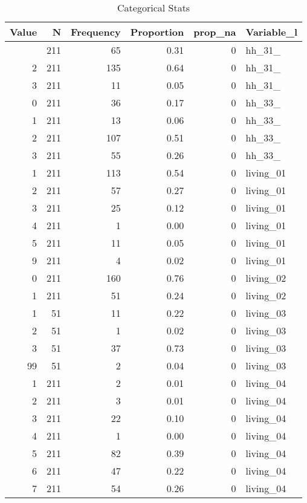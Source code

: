 \begin{table}[!t]
\caption*{
{\large Categorical Stats}
} 
\fontsize{12.0pt}{14.4pt}\selectfont
\begin{tabular*}{\linewidth}{@{\extracolsep{\fill}}rrrrrl}
\toprule
Value & N & Frequency & Proportion & prop\_na & Variable\_l \\ 
\midrule\addlinespace[2.5pt]
0 & 211 & 65 & 0.31 & 0 & hh\_31\_ \\ 
2 & 211 & 135 & 0.64 & 0 & hh\_31\_ \\ 
3 & 211 & 11 & 0.05 & 0 & hh\_31\_ \\ 
0 & 211 & 36 & 0.17 & 0 & hh\_33\_ \\ 
1 & 211 & 13 & 0.06 & 0 & hh\_33\_ \\ 
2 & 211 & 107 & 0.51 & 0 & hh\_33\_ \\ 
3 & 211 & 55 & 0.26 & 0 & hh\_33\_ \\ 
1 & 211 & 113 & 0.54 & 0 & living\_01 \\ 
2 & 211 & 57 & 0.27 & 0 & living\_01 \\ 
3 & 211 & 25 & 0.12 & 0 & living\_01 \\ 
4 & 211 & 1 & 0.00 & 0 & living\_01 \\ 
5 & 211 & 11 & 0.05 & 0 & living\_01 \\ 
9 & 211 & 4 & 0.02 & 0 & living\_01 \\ 
0 & 211 & 160 & 0.76 & 0 & living\_02 \\ 
1 & 211 & 51 & 0.24 & 0 & living\_02 \\ 
1 & 51 & 11 & 0.22 & 0 & living\_03 \\ 
2 & 51 & 1 & 0.02 & 0 & living\_03 \\ 
3 & 51 & 37 & 0.73 & 0 & living\_03 \\ 
99 & 51 & 2 & 0.04 & 0 & living\_03 \\ 
1 & 211 & 2 & 0.01 & 0 & living\_04 \\ 
2 & 211 & 3 & 0.01 & 0 & living\_04 \\ 
3 & 211 & 22 & 0.10 & 0 & living\_04 \\ 
4 & 211 & 1 & 0.00 & 0 & living\_04 \\ 
5 & 211 & 82 & 0.39 & 0 & living\_04 \\ 
6 & 211 & 47 & 0.22 & 0 & living\_04 \\ 
7 & 211 & 54 & 0.26 & 0 & living\_04 \\ 
\bottomrule
\end{tabular*}
\end{table}

